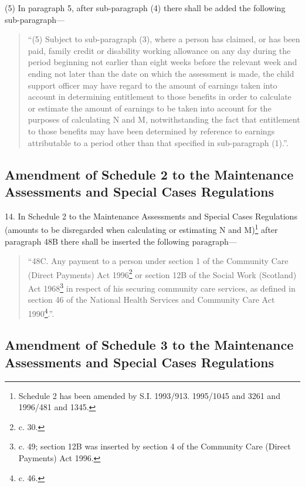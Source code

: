 \documentclass[a4paper]{article}
\begin{document}
(5) In paragraph 5, after sub-paragraph (4) there shall be added the following sub-paragraph—
\begin{quotation}
“(5) Subject to sub-paragraph (3), where a person has claimed, or has been paid, family credit or disability working allowance on any day during the period beginning not earlier than eight weeks before the relevant week and ending not later than the date on which the assessment is made, the child support officer may have regard to the amount of earnings taken into account in determining entitlement to those benefits in order to calculate or estimate the amount of earnings to be taken into account for the purposes of calculating N and M, notwithstanding the fact that entitlement to those benefits may have been determined by reference to earnings attributable to a period other than that specified in sub-paragraph (1).”.
\end{quotation}

\subsection[14. Amendment of Schedule 2 to the Maintenance Assessments and Special Cases Regulations]{Amendment of Schedule 2 to the Maintenance Assessments and Special Cases Regulations}

14.  In Schedule 2 to the Maintenance Assessments and Special Cases Regulations (amounts to be disregarded when calculating or estimating N and M)\footnote{\frenchspacing Schedule 2 has been amended by S.I. 1993/913. 1995/1045 and 3261 and 1996/481 and 1345.} after paragraph 48B there shall be inserted the following paragraph—
\begin{quotation}
“48C.  Any payment to a person under section 1 of the Community Care (Direct Payments) Act 1996\footnote{ c. 30.} or section 12B of the Social Work (Scotland) Act 1968\footnote{ c. 49; section 12B was inserted by section 4 of the Community Care (Direct Payments) Act 1996.} in respect of his securing community care services, as defined in section 46 of the National Health Services and Community Care Act 1990\footnote{ c. 46.}.”.
\end{quotation}

\subsection[15. Amendment of Schedule 3 to the Maintenance Assessments and Special Cases Regulations]{Amendment of Schedule 3 to the Maintenance Assessments and Special Cases Regulations}
\end{document}

